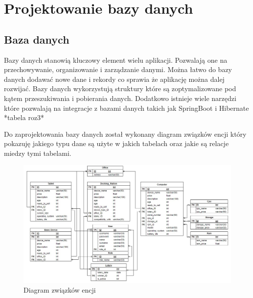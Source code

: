 \chapter{Projektowanie bazy danych}
\section{Baza danych}

Bazy danych stanowią kluczowy element wielu aplikacji. Pozwalają one na przechowywanie, organizowanie i zarządzanie danymi. Można łatwo do bazy danych dodawać nowe dane i rekordy co sprawia że aplikację można dalej rozwijać. Bazy danych wykorzystują struktury które są zoptymalizowane pod kątem przeszukiwania i pobierania danych. Dodatkowo istnieje wiele narzędzi które pozwalają na integracje z bazami danych takich jak SpringBoot i Hibernate *tabela roz3*

Do zaprojektowania bazy danych został wykonany diagram związków encji który pokazuję jakiego typu dane są użyte w jakich tabelach oraz jakie są relacje miedzy tymi tabelami.

\begin{figure}[h]
		\hspace{-2cm}
    \includegraphics[scale=0.65]{rys04/ER_Diagram.jpg}
    \caption{Diagram związków encji}
    \label{ErDiagram_etykieta}
\end{figure}


